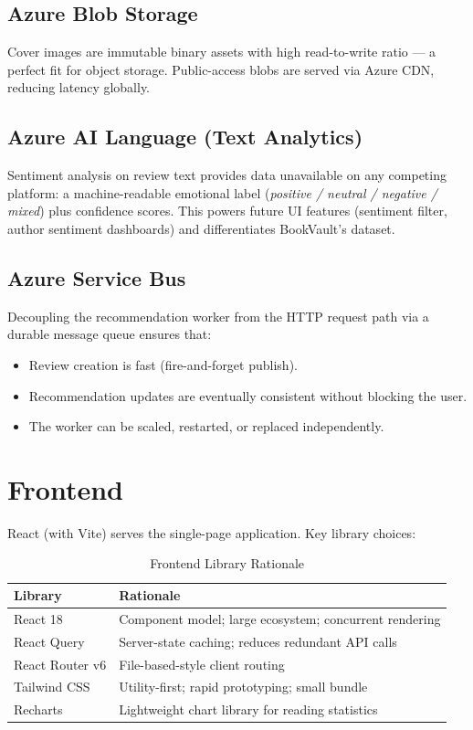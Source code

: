 \documentclass[12pt, a4paper]{report}
\begin{document}
\subsection{Azure Blob Storage}

Cover images are immutable binary assets with high read-to-write ratio — a perfect fit for
object storage. Public-access blobs are served via Azure CDN, reducing latency globally.

\subsection{Azure AI Language (Text Analytics)}

Sentiment analysis on review text provides data unavailable on any competing platform:
a machine-readable emotional label (\textit{positive / neutral / negative / mixed}) plus
confidence scores. This powers future UI features (sentiment filter, author sentiment
dashboards) and differentiates BookVault's dataset.

\subsection{Azure Service Bus}

Decoupling the recommendation worker from the HTTP request path via a durable message queue
ensures that:
\begin{itemize}[nosep]
  \item Review creation is fast (fire-and-forget publish).
  \item Recommendation updates are eventually consistent without blocking the user.
  \item The worker can be scaled, restarted, or replaced independently.
\end{itemize}

\section{Frontend}

React (with Vite) serves the single-page application. Key library choices:

\begin{table}[H]
  \centering
  \caption{Frontend Library Rationale}
  \begin{tabularx}{\textwidth}{L{3.5cm} X}
    \toprule
    \textbf{Library} & \textbf{Rationale} \\
    \midrule
    React 18        & Component model; large ecosystem; concurrent rendering \\
    React Query     & Server-state caching; reduces redundant API calls \\
    React Router v6 & File-based-style client routing \\
    Tailwind CSS    & Utility-first; rapid prototyping; small bundle \\
    Recharts        & Lightweight chart library for reading statistics \\
    \bottomrule
  \end{tabularx}
\end{table}
\end{document}
